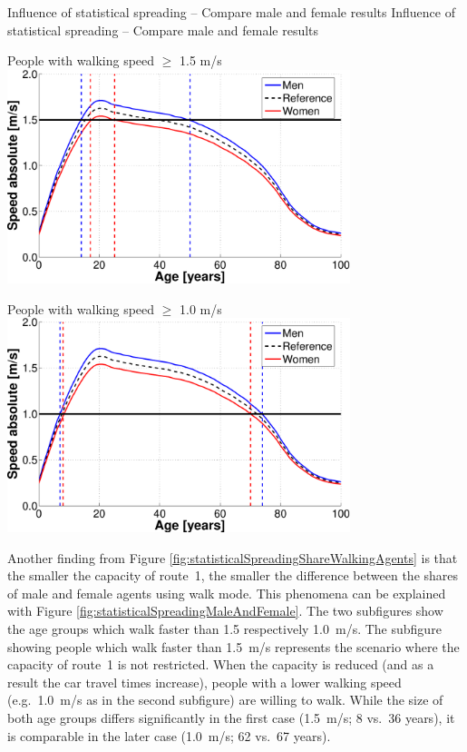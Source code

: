 \createfigure%
{Influence of statistical spreading -- Compare male and female results}%
{Influence of statistical spreading -- Compare male and female results}%
{\label{fig:statisticalSpreadingMaleAndFemale}}%
{%
  \createsubfigure%
  {People with walking speed $\geq$ 1.5 m/s}%
  {\includegraphics[width=0.75\textwidth, angle=0]{extending/figures/MultiModalSimulation/pedestriansAge1_5}}%
  {\label{fig:walkingPeople1.5}}%
  {\vspace{7.5mm}}%

  \createsubfigure%
  {People with walking speed $\geq$ 1.0 m/s}%
  {\includegraphics[width=0.75\textwidth, angle=0]{extending/figures/MultiModalSimulation/pedestriansAge1_0}}%
  {\label{fig:walkingPeople1.0}}%
  {\vspace{3mm}}%
}%
{}

Another finding from Figure \ref{fig:statisticalSpreadingShareWalkingAgents} is that the smaller the capacity of route~1, the smaller the difference between the shares of male and female agents using walk mode. This phenomena can be explained with Figure \ref{fig:statisticalSpreadingMaleAndFemale}. The two subfigures show the age groups which walk faster than 1.5 respectively 1.0~m/s. The subfigure showing people which walk faster than 1.5~m/s represents the scenario where the capacity of route~1 is not restricted. When the capacity is reduced (and as a result the car travel times increase), people with a lower walking speed (e.g.~1.0~m/s as in the second subfigure) are willing to walk. While the size of both age groups differs significantly in the first case (1.5~m/s; 8 vs.~36 years), it is comparable in the later case (1.0~m/s; 62 vs.~67 years).

